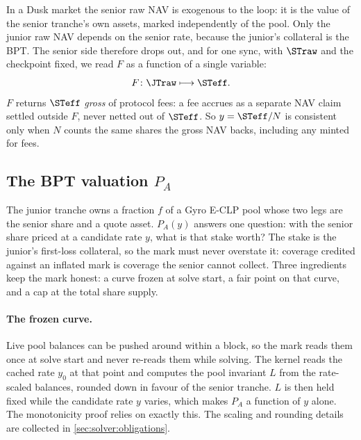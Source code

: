 In a Dusk market the senior raw NAV is exogenous to the loop: it is the
value of the senior tranche's own assets, marked independently of the
pool. Only the junior raw NAV depends on the senior rate, because the
junior's collateral is the BPT. The senior side therefore drops out, and
for one sync, with $\STraw$ and the checkpoint fixed, we read $F$ as a
function of a single variable:
\[
  F\colon \JTraw \longmapsto \STeff.
\]
$F$ returns $\STeff$ \emph{gross} of protocol fees: a fee accrues as a
separate NAV claim settled outside $F$, never netted out of $\STeff$. So
$y = \STeff/N$ is consistent only when $N$ counts the same shares the
gross NAV backs, including any minted for fees.

\subsection{The BPT valuation $P_A$}
\label{sec:setup:PA}

The junior tranche owns a fraction $f$ of a Gyro E-CLP pool whose two
legs are the senior share and a quote asset. $P_A(y)$ answers one
question: with the senior share priced at a candidate rate $y$, what is
that stake worth? The stake is the junior's first-loss collateral, so
the mark must never overstate it: coverage credited against an inflated
mark is coverage the senior cannot collect. Three ingredients keep the
mark honest: a curve frozen at solve start, a fair point on that curve,
and a cap at the total share supply.

\paragraph{The frozen curve.}
Live pool balances can be pushed around within a block, so the mark
reads them once at solve start and never re-reads them while solving.
The kernel reads the cached rate $y_0$ at that point and computes the
pool invariant $L$ from the rate-scaled balances, rounded down in favour
of the senior tranche. $L$ is then held fixed while the candidate rate
$y$ varies, which makes $P_A$ a function of $y$ alone. The monotonicity
proof relies on exactly this. The scaling and rounding details are
collected in \cref{sec:solver:obligations}.

